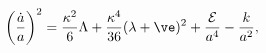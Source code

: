 \begin{equation}\label{RSaeq}
    \left(\frac{\dot{a}}{a}\right)^2=\frac{\kappa^2}{6} \Lambda
  + \frac{\kappa^4}{36}
  (\lambda  +\ve)^2+\frac{\mathcal{E}}{a^4}-\frac{k}{a^2},
\end{equation}


